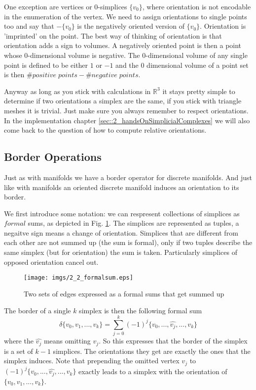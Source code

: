 One exception are vertices or 0-simplices $\{v_0\}$, where orientation is not encodable in the enumeration of the vertex. We need to assign orientations to single points too and say that $-\{v_0\}$ is the negatively oriented version of $\{v_0\}$. Orientation is 'imprinted' on the point. The best way of thinking of orientation is that orientation adds a sign to volumes. A negatively oriented point is then a point whose $0$-dimensional volume is negative. The $0$-dimensional volume of any single point is defined to be either $1$ or $-1$ and the 0 dimensional volume of a point set is then $\#positive\; points - \#negative\; points$.

Anyway as long as you stick with calculations in $\mathbb R^3$ it stays pretty simple to determine if two orientations a simplex are the same, if you stick with triangle meshes it is trivial. Just make sure you always remember to respect orientations. In the implementation chapter \ref{sec::2_handsOnSimplicialComplexes} we will also come back to the question of how to compute relative orientations.


\subsection{Border Operations}
\label{sec::2_borderOrientation}

Just as with manifolds we have a border operator for discrete manifolds. And just like with manifolds an oriented discrete manifold induces an orientation to its border.

We first introduce some notation: we can respresent collections of simplices as $formal$ sums, as depicted in Fig. \ref{fig::2_2_formalsum}. The simplices are represented as tuples, a negaitve sign means a change of orientation. Simplices that are different from each other are not summed up (the sum is formal), only if two tuples describe the same simplex (but for orientation) the sum is taken. Particularly simplices of opposed orientation cancel out.
\begin{figure}
\begin{center}
\texttt{[image: imgs/2\_2\_formalsum.eps]}
\end{center}
\caption{Two sets of edges expressed as a formal sums that get summed up}
\label{fig::2_2_formalsum}
\end{figure}

The border of a single $k$ simplex is then the following formal sum
\[\delta\{v_0,v_1,...,v_k\} = \sum_{j=0}^k (-1)^j\{v_0,...,\widehat{v_j},...,v_k\}\]
where  the $\widehat{v_j}$ means omitting $v_j$. So this expresses that the border of the simplex is a set of $k-1$ simplices. The orientations they get are exactly the ones that the simplex induces. Note that prepending the omitted vertex $v_j$ to $(-1)^j\{v_0,...,\widehat{v_j},...,v_k\}$ exactly leads to a simplex with the orientation of $\{v_0,v_1,...,v_k\}$.

